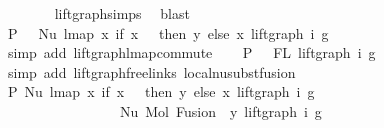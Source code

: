 \begin{isabellebody}
\ \ \ \ \ \ \isamarkupfalse%
\ lift{\isacharunderscore}{\kern0pt}graph{\isachardot}{\kern0pt}simps{\isacharparenleft}{\kern0pt}{}{\isacharparenright}{\kern0pt}\ \isamarkupfalse%
\ blast\isanewline
\ \ \isamarkupfalse%
\ P{}{\isacharcolon}{\kern0pt}\ {\isachardoublequoteopen}{\isachardot}{\kern0pt}{\isachardot}{\kern0pt}{\isachardot}{\kern0pt}\ {\isacharequal}{\kern0pt}\ Nu\ {\isacharparenleft}{\kern0pt}lmap\ {\isacharparenleft}{\kern0pt}{\isasymlambda}x{\isachardot}{\kern0pt}\ if\ x\ {\isacharequal}{\kern0pt}\ {}\ then\ y\ else\ x{\isacharparenright}{\kern0pt}\ {\isacharparenleft}{\kern0pt}lift{\isacharunderscore}{\kern0pt}graph\ i\ g{\isacharparenright}{\kern0pt}{\isacharparenright}{\kern0pt}{\isachardoublequoteclose}\isanewline
\ \ \ \ \ \ \isamarkupfalse%
\ {\isacharparenleft}{\kern0pt}simp\ add{\isacharcolon}{\kern0pt}\ lift{\isacharunderscore}{\kern0pt}graph{\isacharunderscore}{\kern0pt}lmap{\isacharunderscore}{\kern0pt}commute{\isacharparenright}{\kern0pt}\isanewline
\ \ \isamarkupfalse%
\ P{}{\isacharcolon}{\kern0pt}\ {\isachardoublequoteopen}{}\ {\isasymin}\ FL\ {\isacharparenleft}{\kern0pt}lift{\isacharunderscore}{\kern0pt}graph\ i\ g{\isacharparenright}{\kern0pt}{\isachardoublequoteclose}\isanewline
\ \ \ \ \ \isamarkupfalse%
\ {\isacharparenleft}{\kern0pt}simp\ add{\isacharcolon}{\kern0pt}\ lift{\isacharunderscore}{\kern0pt}graph{\isacharunderscore}{\kern0pt}freelinks\ local{\isachardot}{\kern0pt}nu{\isacharunderscore}{\kern0pt}subst{\isacharunderscore}{\kern0pt}fusion{}{\isacharparenright}{\kern0pt}\isanewline
\ \ \isamarkupfalse%
\ \isamarkupfalse%
\ P{}{\isacharcolon}{\kern0pt}\ {\isachardoublequoteopen}Nu\ {\isacharparenleft}{\kern0pt}lmap\ {\isacharparenleft}{\kern0pt}{\isasymlambda}x{\isachardot}{\kern0pt}\ if\ x\ {\isacharequal}{\kern0pt}\ {}\ then\ y\ else\ x{\isacharparenright}{\kern0pt}\ {\isacharparenleft}{\kern0pt}lift{\isacharunderscore}{\kern0pt}graph\ i\ g{\isacharparenright}{\kern0pt}{\isacharparenright}{\kern0pt}\ {\isasymsimeq}\isanewline
\ \ \ \ \ \ \ \ \ \ \ \ \ \ \ \ \ Nu\ {\isacharparenleft}{\kern0pt}Mol\ {\isacharparenleft}{\kern0pt}Fusion\ {}\ y{\isacharparenright}{\kern0pt}\ {\isacharparenleft}{\kern0pt}lift{\isacharunderscore}{\kern0pt}graph\ i\ g{\isacharparenright}{\kern0pt}{\isacharparenright}{\kern0pt}{\isachardoublequoteclose}\isanewline
\ \ \ \ \ \isamarkupfalse%

\end{isabellebody}
